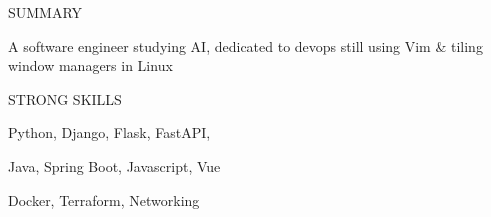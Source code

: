\documentclass{cv} %
\def\sidespacing{0.5cm}
\begin{document}
\begin{minipage}[b][0.9\paperheight][t]{0.29\linewidth}

\begin{minipage}[c]{\linewidth}
    \centering
\end{minipage}

\vspace{\sidespacing}

\begin{rSection}{SUMMARY}
    \item A software engineer studying AI, dedicated to devops
        still using Vim \& tiling window managers in Linux
\end{rSection}

\vspace{\sidespacing}

\begin{rSection}{STRONG SKILLS}
    \item Python, Django, Flask, FastAPI,  
    \item Java, Spring Boot, Javascript, Vue
    \item Docker, Terraform, Networking
\end{rSection}

\vspace{\sidespacing}


\end{minipage}
\end{document}
